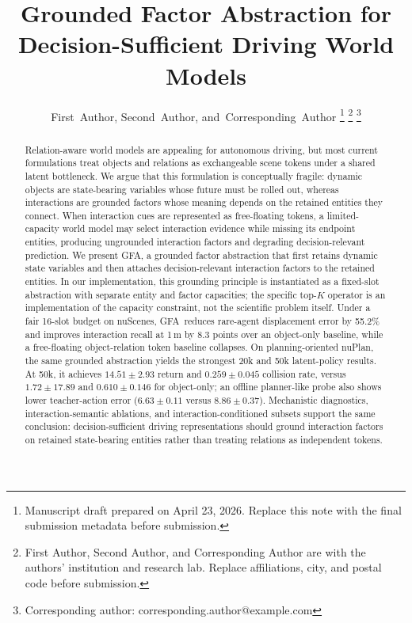 \documentclass[journal]{IEEEtran}
\newcommand{\method}{\textsc{GFA}}
\begin{document}
\title{Grounded Factor Abstraction for Decision-Sufficient Driving World Models}

\author{First~Author,
        Second~Author,
        and~Corresponding~Author%
\thanks{Manuscript draft prepared on April 23, 2026. Replace this note with the final submission metadata before submission.}%
\thanks{First Author, Second Author, and Corresponding Author are with the authors' institution and research lab. Replace affiliations, city, and postal code before submission.}%
\thanks{Corresponding author: corresponding.author@example.com}}

\maketitle

\begin{abstract}
Relation-aware world models are appealing for autonomous driving, but most current formulations treat objects and relations as exchangeable scene tokens under a shared latent bottleneck. We argue that this formulation is conceptually fragile: dynamic objects are state-bearing variables whose future must be rolled out, whereas interactions are grounded factors whose meaning depends on the retained entities they connect. When interaction cues are represented as free-floating tokens, a limited-capacity world model may select interaction evidence while missing its endpoint entities, producing ungrounded interaction factors and degrading decision-relevant prediction. We present \method, a grounded factor abstraction that first retains dynamic state variables and then attaches decision-relevant interaction factors to the retained entities. In our implementation, this grounding principle is instantiated as a fixed-slot abstraction with separate entity and factor capacities; the specific top-$K$ operator is an implementation of the capacity constraint, not the scientific problem itself. Under a fair 16-slot budget on nuScenes, \method\ reduces rare-agent displacement error by 55.2\% and improves interaction recall at 1\,m by 8.3 points over an object-only baseline, while a free-floating object-relation token baseline collapses. On planning-oriented nuPlan, the same grounded abstraction yields the strongest 20k and 50k latent-policy results. At 50k, it achieves $14.51 \pm 2.93$ return and $0.259 \pm 0.045$ collision rate, versus $1.72 \pm 17.89$ and $0.610 \pm 0.146$ for object-only; an offline planner-like probe also shows lower teacher-action error ($6.63 \pm 0.11$ versus $8.86 \pm 0.37$). Mechanistic diagnostics, interaction-semantic ablations, and interaction-conditioned subsets support the same conclusion: decision-sufficient driving representations should ground interaction factors on retained state-bearing entities rather than treating relations as independent tokens.
\end{abstract}
\end{document}
